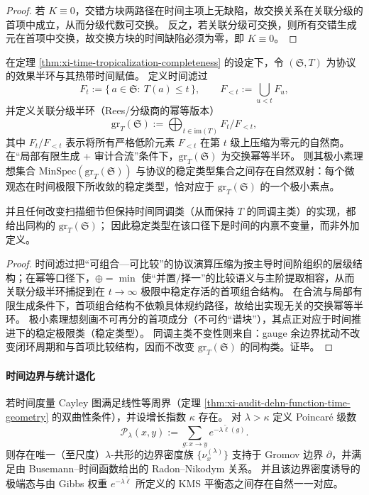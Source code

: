 \begin{proof}
若 \(K\equiv 0\)，交错方块两路径在时间主项上无缺陷，故交换关系在关联分级的首项中成立，从而分级代数可交换。
反之，若关联分级可交换，则所有交错生成元在首项中交换，故交换方块的时间缺陷必须为零，即 \(K\equiv 0\)。
\end{proof}

\begin{theorem}\label{thm:xi-stable-type-minspec-graded-semiring}
在定理 \ref{thm:xi-time-tropicalization-completeness} 的设定下，令 \((\mathfrak S,T)\) 为协议的效果半环与其热带时间赋值。
定义时间滤过
\[
F_t:=\{\,a\in\mathfrak S:\ T(a)\le t\,\},
\qquad
F_{<t}:=\bigcup_{u<t}F_u,
\]
并定义关联分级半环（Rees/分级商的幂等版本）
\[
\mathrm{gr}_T(\mathfrak S):=\bigoplus_{t\in\mathrm{im}(T)} F_t/F_{<t},
\]
其中 \(F_t/F_{<t}\) 表示将所有严格低阶元素 \(F_{<t}\) 在第 \(t\) 级上压缩为零元的自然商。
在“局部有限生成 + 审计合流”条件下，\(\mathrm{gr}_T(\mathfrak S)\) 为交换幂等半环。
则其极小素理想集合 \(\mathrm{MinSpec}(\mathrm{gr}_T(\mathfrak S))\) 与协议的稳定类型集合之间存在自然双射：每个微观态在时间极限下所收敛的稳定类型，恰对应于 \(\mathrm{gr}_T(\mathfrak S)\) 的一个极小素点。
\par
并且任何改变扫描细节但保持时间同调类（从而保持 \(T\) 的同调主类）的实现，都给出同构的 \(\mathrm{gr}_T(\mathfrak S)\)；
因此稳定类型在该口径下是时间的内禀不变量，而非外加定义。
\end{theorem}
\begin{proof}
时间滤过把“可组合—可比较”的协议演算压缩为按主导时间阶组织的层级结构；在幂等口径下，\(\oplus=\min\) 使“并置/择一”的比较语义与主阶提取相容，从而关联分级半环捕捉到在 \(t\to\infty\) 极限中稳定存活的首项组合结构。
在合流与局部有限生成条件下，首项组合结构不依赖具体规约路径，故给出实现无关的交换幂等半环。
极小素理想刻画不可再分的首项成分（不可约“谱块”），其点正对应于时间推进下的稳定极限类（稳定类型）。
同调主类不变性则来自：gauge 余边界扰动不改变闭环周期和与首项比较结构，因而不改变 \(\mathrm{gr}_T(\mathfrak S)\) 的同构类。证毕。
\end{proof}

\paragraph{时间边界与统计退化}

\begin{theorem}\label{thm:xi-time-boundary-patterson-sullivan-kms}
若时间度量 Cayley 图满足线性等周界（定理 \ref{thm:xi-audit-dehn-function-time-geometry} 的双曲性条件），并设增长指数 \(\kappa\) 存在。
对 \(\lambda>\kappa\) 定义 Poincar\'e 级数
\[
\mathcal P_\lambda(x,y):=\sum_{g:x\to y}e^{-\lambda \widetilde{\ell}(g)}.
\]
则存在唯一（至尺度）\(\lambda\)-共形的边界密度族 \(\{\nu_x^{(\lambda)}\}\) 支持于 Gromov 边界 \(\partial\)，并满足由 Busemann--时间函数给出的 Radon--Nikodym 关系。
并且该边界密度诱导的极端态与由 Gibbs 权重 \(e^{-\lambda\widetilde{\ell}}\) 所定义的 KMS 平衡态之间存在自然一一对应。
\end{theorem}

